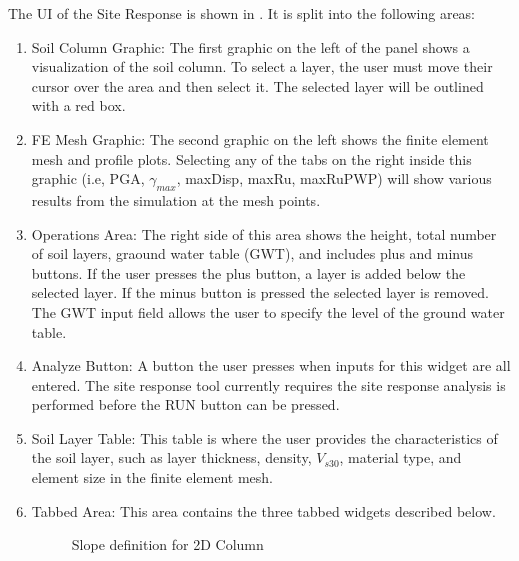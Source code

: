 The UI of the Site Response is shown in . It is split into the following areas:
\begin{enumerate}
\item Soil Column Graphic: The first graphic on the left of the panel shows a visualization of the soil column. To select a layer, the user must move their cursor over the area and then select it. The selected layer will be outlined with a red box.
\item FE Mesh Graphic: The second graphic on the left shows 
the finite element mesh and profile plots. Selecting any of the tabs on the right inside this graphic (i.e, PGA, $\gamma_{max}$, maxDisp, maxRu, maxRuPWP) will show various results
from the simulation at the mesh points.
\item Operations Area: The right side of this area shows the height, total number of soil layers, graound water table (GWT), and includes plus and minus buttons. 
If the user presses the plus button, a layer is added below the selected layer. If the minus button is pressed the selected layer is removed. The GWT input field allows the user to specify the level of the ground water table.
\item Analyze Button: A button the user presses when inputs for this widget are all entered. The site response tool currently requires the site response analysis is performed before the RUN button can be pressed.
\item Soil Layer Table: This table is where the user provides the characteristics of the soil layer, such as layer thickness, density, $V_{s30}$, material type, and element size in the finite element mesh.
\item Tabbed Area: This area contains the three tabbed widgets described below.

\begin{figure}[!htbp]
  \caption{Slope definition for 2D Column }
  \label{fig:slope2D}
\end{figure}



\end{enumerate}
